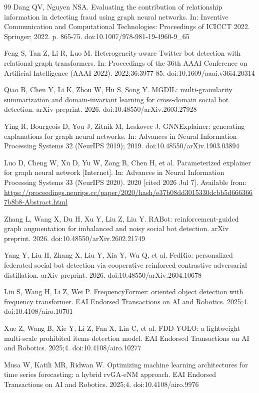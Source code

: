 \documentclass[fonts]{icst}
\begin{document}
\begin{thebibliography}{99}
Dang QV, Nguyen NSA. Evaluating the contribution of relationship information in detecting fraud using graph neural networks. In: Inventive Communication and Computational Technologies: Proceedings of ICICCT 2022. Springer; 2022. p. 865-75. doi:10.1007/978-981-19-4960-9\_65

Feng S, Tan Z, Li R, Luo M. Heterogeneity-aware Twitter bot detection with relational graph transformers. In: Proceedings of the 36th AAAI Conference on Artificial Intelligence (AAAI 2022). 2022;36:3977-85. doi:10.1609/aaai.v36i4.20314

Qiao B, Chen Y, Li K, Zhou W, Hu S, Song Y. MGDIL: multi-granularity summarization and domain-invariant learning for cross-domain social bot detection. arXiv preprint. 2026. doi:10.48550/arXiv.2603.27928

Ying R, Bourgeois D, You J, Zitnik M, Leskovec J. GNNExplainer: generating explanations for graph neural networks. In: Advances in Neural Information Processing Systems 32 (NeurIPS 2019); 2019. doi:10.48550/arXiv.1903.03894

Luo D, Cheng W, Xu D, Yu W, Zong B, Chen H, et al. Parameterized explainer for graph neural network [Internet]. In: Advances in Neural Information Processing Systems 33 (NeurIPS 2020). 2020 [cited 2026 Jul 7]. Available from: \url{https://proceedings.neurips.cc/paper/2020/hash/e37b08dd3015330dcbb5d6663667b8b8-Abstract.html}

Zhang L, Wang X, Du H, Xu Y, Liu Z, Liu Y. RABot: reinforcement-guided graph augmentation for imbalanced and noisy social bot detection. arXiv preprint. 2026. doi:10.48550/arXiv.2602.21749

Yang Y, Liu H, Zhang X, Liu Y, Xia Y, Wu Q, et al. FedRio: personalized federated social bot detection via cooperative reinforced contrastive adversarial distillation. arXiv preprint. 2026. doi:10.48550/arXiv.2604.10678

Liu S, Wang H, Li Z, Wei P. FrequencyFormer: oriented object detection with frequency transformer. EAI Endorsed Transactions on AI and Robotics. 2025;4. doi:10.4108/airo.10701

Xue Z, Wang B, Xie Y, Li Z, Fan X, Lin C, et al. FDD-YOLO: a lightweight multi-scale prohibited items detection model. EAI Endorsed Transactions on AI and Robotics. 2025;4. doi:10.4108/airo.10277

Musa W, Katili MR, Ridwan W. Optimizing machine learning architectures for time series forecasting: a hybrid rvGA-eNM approach. EAI Endorsed Transactions on AI and Robotics. 2025;4. doi:10.4108/airo.9976

\end{thebibliography}
\end{document}
